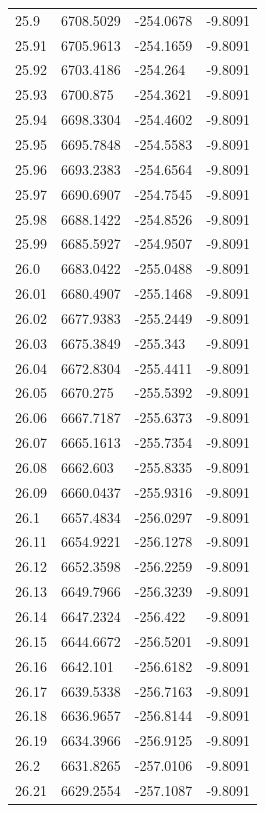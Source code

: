 \begin{table}[H]
\begin{tabular}{llll}
25.9 & 6708.5029 & -254.0678 & -9.8091 \\
25.91 & 6705.9613 & -254.1659 & -9.8091 \\
25.92 & 6703.4186 & -254.264 & -9.8091 \\
25.93 & 6700.875 & -254.3621 & -9.8091 \\
25.94 & 6698.3304 & -254.4602 & -9.8091 \\
25.95 & 6695.7848 & -254.5583 & -9.8091 \\
25.96 & 6693.2383 & -254.6564 & -9.8091 \\
25.97 & 6690.6907 & -254.7545 & -9.8091 \\
25.98 & 6688.1422 & -254.8526 & -9.8091 \\
25.99 & 6685.5927 & -254.9507 & -9.8091 \\
26.0 & 6683.0422 & -255.0488 & -9.8091 \\
26.01 & 6680.4907 & -255.1468 & -9.8091 \\
26.02 & 6677.9383 & -255.2449 & -9.8091 \\
26.03 & 6675.3849 & -255.343 & -9.8091 \\
26.04 & 6672.8304 & -255.4411 & -9.8091 \\
26.05 & 6670.275 & -255.5392 & -9.8091 \\
26.06 & 6667.7187 & -255.6373 & -9.8091 \\
26.07 & 6665.1613 & -255.7354 & -9.8091 \\
26.08 & 6662.603 & -255.8335 & -9.8091 \\
26.09 & 6660.0437 & -255.9316 & -9.8091 \\
26.1 & 6657.4834 & -256.0297 & -9.8091 \\
26.11 & 6654.9221 & -256.1278 & -9.8091 \\
26.12 & 6652.3598 & -256.2259 & -9.8091 \\
26.13 & 6649.7966 & -256.3239 & -9.8091 \\
26.14 & 6647.2324 & -256.422 & -9.8091 \\
26.15 & 6644.6672 & -256.5201 & -9.8091 \\
26.16 & 6642.101 & -256.6182 & -9.8091 \\
26.17 & 6639.5338 & -256.7163 & -9.8091 \\
26.18 & 6636.9657 & -256.8144 & -9.8091 \\
26.19 & 6634.3966 & -256.9125 & -9.8091 \\
26.2 & 6631.8265 & -257.0106 & -9.8091 \\
26.21 & 6629.2554 & -257.1087 & -9.8091 \\

\end{tabular}
\end{table}

